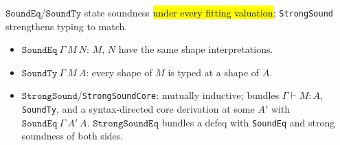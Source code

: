 \begin{definition}
\label{def:expa-soundeq-strongsound}
\leanok
{}

 $\mathtt{SoundEq}$/$\mathtt{SoundTy}$ state soundness \hl{under every fitting
valuation}; \texttt{StrongSound} strengthens typing to match.
\begin{itemize}
\item $\mathtt{SoundEq}\ \Gamma\ M\ N$: $M$, $N$ have the same shape interpretations.
\item $\mathtt{SoundTy}\ \Gamma\ M\ A$: every shape of $M$ is typed at a shape of $A$.
\item $\mathtt{StrongSound}$/\texttt{StrongSoundCore}: mutually inductive; bundles
$\Gamma\vdash M:A$, \texttt{SoundTy}, and a syntax-directed core derivation at some $A'$ with
$\mathtt{SoundEq}\ \Gamma\ A'\ A$. $\mathtt{StrongSoundEq}$ bundles a defeq with \texttt{SoundEq} and
strong soundness of both sides.
\end{itemize}
\end{definition}


